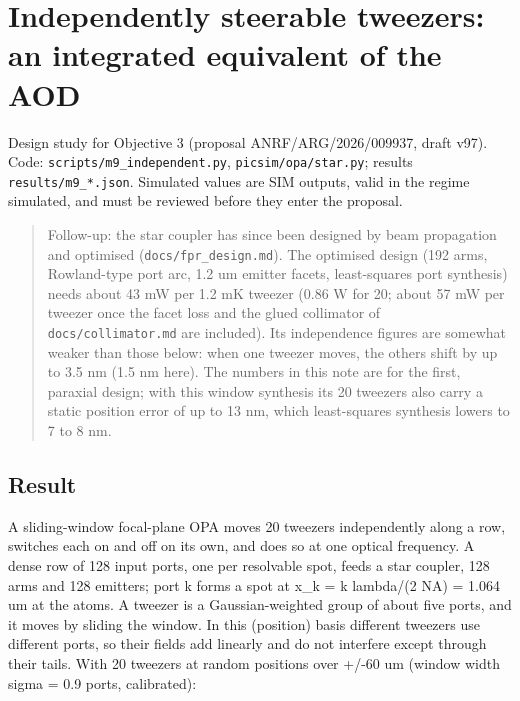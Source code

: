 \hypertarget{independently-steerable-tweezers-an-integrated-equivalent-of-the-aod}{%
\chapter{Independently steerable tweezers: an integrated equivalent of
the
AOD}\label{independent_steering-independently-steerable-tweezers-an-integrated-equivalent-of-the-aod}}

Design study for Objective 3 (proposal ANRF/ARG/2026/009937, draft v97).
Code: \texttt{scripts/m9\_independent.py}, \texttt{picsim/opa/star.py};
results \texttt{results/m9\_*.json}. Simulated values are SIM outputs,
valid in the regime simulated, and must be reviewed before they enter
the proposal.

\begin{quote}
Follow-up: the star coupler has since been designed by beam propagation
and optimised (\texttt{docs/fpr\_design.md}). The optimised design (192
arms, Rowland-type port arc, 1.2 um emitter facets, least-squares port
synthesis) needs about 43 mW per 1.2 mK tweezer (0.86 W for 20; about 57
mW per tweezer once the facet loss and the glued collimator of
\texttt{docs/collimator.md} are included). Its independence figures are
somewhat weaker than those below: when one tweezer moves, the others
shift by up to 3.5 nm (1.5 nm here). The numbers in this note are for
the first, paraxial design; with this window synthesis its 20 tweezers
also carry a static position error of up to 13 nm, which least-squares
synthesis lowers to 7 to 8 nm.
\end{quote}

\hypertarget{1-result}{%
\section{Result}\label{independent_steering-1-result}}

A sliding-window focal-plane OPA moves 20 tweezers independently along a
row, switches each on and off on its own, and does so at one optical
frequency. A dense row of 128 input ports, one per resolvable spot,
feeds a star coupler, 128 arms and 128 emitters; port k forms a spot at
x\_k = k lambda/(2 NA) = 1.064 um at the atoms. A tweezer is a
Gaussian-weighted group of about five ports, and it moves by sliding the
window. In this (position) basis different tweezers use different ports,
so their fields add linearly and do not interfere except through their
tails. With 20 tweezers at random positions over +/-60 um (window width
sigma = 0.9 ports, calibrated):


